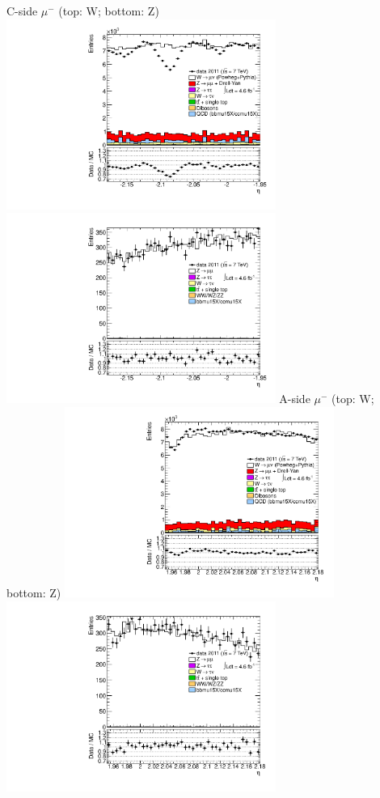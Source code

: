  {
\colb[T]
C-side $\mu^{-}$ (top: W; bottom: Z)
\centering
\includegraphics[width=0.66\textwidth]{dates/20130306/figures/both/W_10_C_stack_l_eta_NEG} \\
\includegraphics[width=0.66\textwidth]{dates/20130306/figures/both/ZlObarrel_10_C_stack_lN_eta_ALL.pdf}
A-side $\mu^{-}$ (top: W; bottom: Z)
\centering
\includegraphics[width=0.66\textwidth]{dates/20130306/figures/both/W_10_A_stack_l_eta_NEG} \\
\includegraphics[width=0.66\textwidth]{dates/20130306/figures/both/ZlObarrel_10_A_stack_lN_eta_ALL.pdf} 
\cole
}

